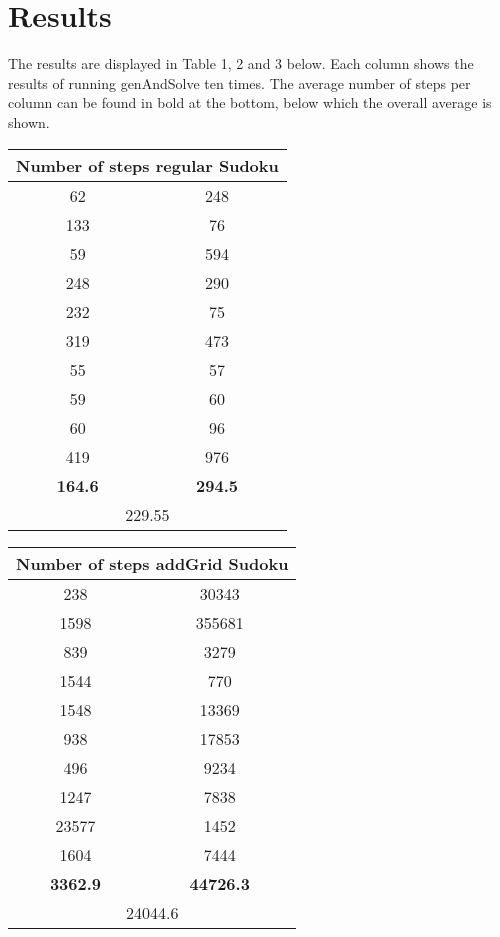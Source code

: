 \documentclass[12pt,a4paper]{article}
\begin{document}
\section{Results}
The results are displayed in Table 1, 2 and 3 below. Each column shows the results of
running genAndSolve ten times. The average number of steps per column can be found in bold at the bottom,
below which the overall average is shown.
\begin{center}
 \begin{tabular}{|c | c |}
 \hline
 \multicolumn{2}{|c|}{\textbf{Number of steps regular Sudoku}} \\[0.5ex]
 \hline\hline
 62 & 248  \\
 \hline
 133 & 76 \\
 \hline
 59 & 594 \\
 \hline
 248 & 290 \\
 \hline
 232 & 75 \\
 \hline
 319 & 473 \\
 \hline
 55 & 57 \\
 \hline
 59 & 60 \\
 \hline
 60 & 96 \\
 \hline
 419 & 976 \\
 \hline\hline
 \textbf{164.6} & \textbf{294.5} \\
 \hline
 \multicolumn{2}{|c|}{229.55} \\
 \hline
\end{tabular}
\end{center}

\begin{center}
 \begin{tabular}{|c | c |}
 \hline
 \multicolumn{2}{|c|}{\textbf{Number of steps addGrid Sudoku}} \\[0.5ex]
 \hline\hline
 238 & 30343  \\
 \hline
 1598 & 355681 \\
 \hline
 839 & 3279 \\
 \hline
 1544 & 770 \\
 \hline
 1548 & 13369 \\
 \hline
 938 & 17853 \\
 \hline
 496 & 9234 \\
 \hline
 1247 & 7838 \\
 \hline
 23577 & 1452 \\
 \hline
 1604 & 7444 \\
 \hline\hline
 \textbf{3362.9} & \textbf{44726.3} \\
 \hline
 \multicolumn{2}{|c|}{24044.6} \\
 \hline
\end{tabular}
\end{center}
\end{document}
